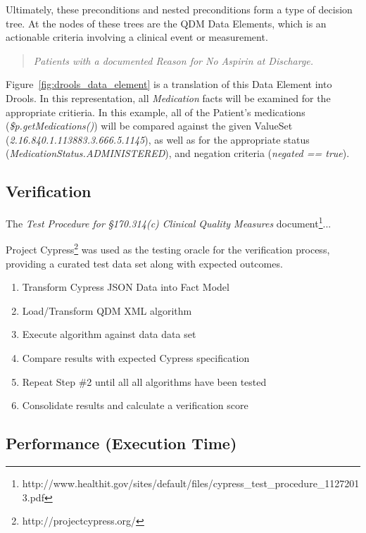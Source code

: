 \documentclass{amia}
\begin{document}
Ultimately, these preconditions and nested preconditions form a type of decision tree. At the nodes of these trees are the QDM Data Elements\cite{http://www.healthit.gov/sites/default/files/qdm_122012.pdf}, which is an actionable criteria involving a clinical event or measurement.

\begin{quote}
\textit{Patients with a documented Reason for No Aspirin at Discharge.}
\end{quote}

Figure~\ref{fig:drools_data_element} is a translation of this Data Element into Drools. In this representation, all \textit{Medication} facts will be examined for the appropriate critieria. In this example, all of the Patient's medications (\textit{\$p.getMedications()}) will be compared against the given ValueSet (\textit{2.16.840.1.113883.3.666.5.1145}), as well as for the appropriate status (\textit{MedicationStatus.ADMINISTERED}), and negation criteria (\textit{negated == true}).

\subsection*{Verification}
The \textit{Test Procedure for §170.314(c) Clinical Quality Measures} document\footnote{http://www.healthit.gov/sites/default/files/cypress\_test\_procedure\_11272013.pdf}...

Project Cypress\footnote{http://projectcypress.org/} was used as the testing oracle for the verification process, providing a curated test data set along with expected outcomes.

\begin{enumerate}
  \item Transform Cypress JSON Data into Fact Model
  \item Load/Transform QDM XML algorithm
  \item Execute algorithm against data data set
  \item Compare results with expected Cypress specification
  \item Repeat Step \#2 until all all algorithms have been tested
  \item Consolidate results and calculate a verification score
\end{enumerate}


\subsection*{Performance (Execution Time)}
\end{document}
